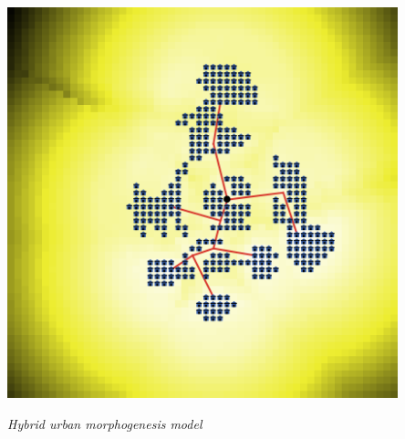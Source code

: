 {\begin{columns}
\begin{column}{0.5\linewidth}
		
		\begin{center}
	\includegraphics[width=0.85\textwidth]{figures/intro_RBD_lattice.png}
	\end{center}
	
\textit{Hybrid urban morphogenesis model}
	
	\cite{raimbault2014hybrid}
 
		
	
	\end{column}
\end{columns}




}


